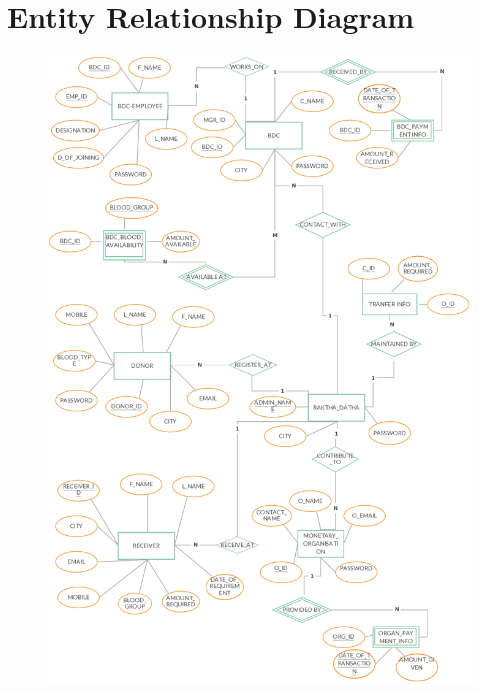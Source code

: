\section{Entity Relationship Diagram}
\begin{figure}[htb]
\centering
\includegraphics[scale=0.6]{./er} %
\label{fig:label} %
\end{figure}

